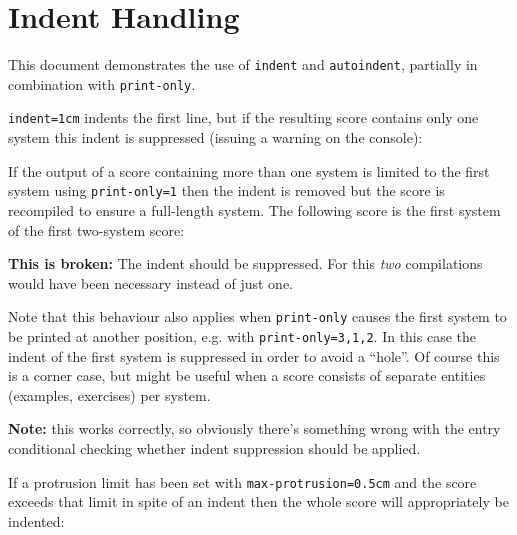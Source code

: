 \documentclass{scrartcl}
\begin{document}
\section*{Indent Handling}

This document demonstrates the use of \texttt{indent} and \texttt{autoindent},
partially in combination with \texttt{print-only}.

\texttt{indent=1cm} indents the first line, but if the resulting score contains
only one system this indent is suppressed (issuing a warning on the console):



If the output of a score containing more than one system is limited to the first
system using \texttt{print-only=1} then the indent is removed but the score is
recompiled to ensure a full-length system. The following score is the first
system of the first two-system score:

\textbf{This is broken:} The indent should be suppressed. For
this \emph{two} compilations would have been necessary instead of just one.


Note that this behaviour also applies when \texttt{print-only} causes the first
system to be printed at another position, e.g. with \texttt{print-only={3,1,2}}.
In this case the indent of the first system is suppressed in order to avoid a
“hole”. Of course this is a corner case, but might be useful when a score
consists of separate entities (examples, exercises) per system.

\textbf{Note:} this works correctly, so obviously there's something wrong with
the entry conditional checking whether indent suppression should be applied.



If a protrusion limit has been set with \texttt{max-protrusion=0.5cm} and the
score exceeds that limit in spite of an indent then the whole score will
appropriately be indented:
\end{document}
